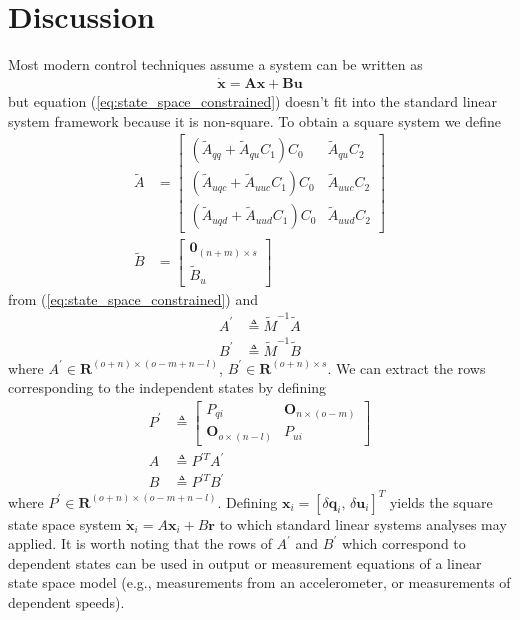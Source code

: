 \documentclass[smallcondensed,final]{svjour3}                     %
\begin{document}
\section{Discussion}
\label{sec:discussion}
Most modern control techniques assume a system can be written as
\begin{align}
\dot{\mathbf{x}} = \mathbf{A}\mathbf{x} + \mathbf{B}\mathbf{u}
\end{align}
but equation (\ref{eq:state_space_constrained}) doesn't fit into the standard
linear system framework because it is non-square.
To obtain a square system we define
\begin{align}
\tilde{A} &=
   \left[
     \begin{array}{cc}
       (\tilde{A}_{qq} + \tilde{A}_{qu} C_1 ) C_0 & \tilde{A}_{qu} C_2 \\
       (\tilde{A}_{uqc} + \tilde{A}_{uuc} C_1 ) C_0 & \tilde{A}_{uuc} C_2\\
       (\tilde{A}_{uqd} + \tilde{A}_{uud} C_1 ) C_0 & \tilde{A}_{uud} C_2
     \end{array}
   \right]\\
\tilde{B} &= 
    \left[
      \begin{array}{c}
        \bm{0}_{(n+m) \times s} \\
        \tilde{B}_{u}
      \end{array}
    \right]
\end{align}
from (\ref{eq:state_space_constrained}) and
\begin{align}
  \label{eq:A_prime}
    A^\prime &\triangleq \tilde{M}^{-1} \tilde{A} \\
  \label{eq:B_prime}
    B^\prime &\triangleq \tilde{M}^{-1} \tilde{B}
\end{align}
where  $A^\prime \in \bm{R}^{(o + n) \times (o - m + n -l)}$, $B^\prime \in
\bm{R}^{(o + n) \times s}$.  We can extract the rows corresponding to the
independent states by defining
\begin{align}
  \label{eq:P_prime}
    P^\prime &\triangleq \begin{bmatrix}
        P_{qi} & \bm{O}_{n \times (o - m)} \\
        \bm{O}_{o \times (n - l)} & P_{ui}
    \end{bmatrix} \\
  \label{eq:A}
    A &\triangleq P^{\prime T} A^\prime \\
  \label{eq:B}
    B &\triangleq P^{\prime T} B^\prime
\end{align}
where $P^\prime \in \bm{R}^{(o + n) \times (o - m + n - l)}$.  Defining
$\bm{x}_i = \left[\delta\bm{q}_i,\,\delta\bm{u}_i\right]^{T}$ yields the square
state space system $\dot{\bm{x}}_i = A \bm{x}_i + B \bm{r}$ to which standard
linear systems analyses may applied.  It is worth noting that the rows of
$A^\prime$ and $B^\prime$ which correspond to dependent states can be used in
output or measurement equations of a linear state space model (e.g.,
measurements from an accelerometer, or measurements of dependent speeds).
\end{document}
